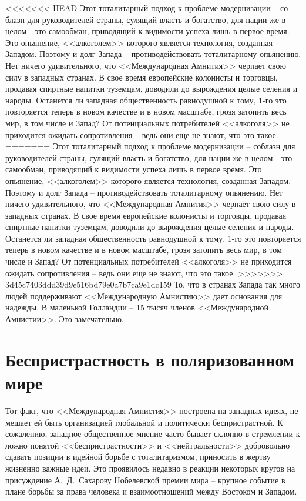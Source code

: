 \documentclass{book}
\begin{document}
{<<<<<<< HEAD
Этот тоталитарный подход к проблеме модернизации -- со­блазн для руководителей страны, сулящий власть и богатство, для нации же в целом ‑ это самообман, приводящий к види­мости успеха лишь в первое время. Это опьянение, <<алкого­лем>> которого является технология, созданная Западом. Поэто­му и долг Запада -- противодействовать тоталитарному опья­нению. Нет ничего удивительного, что <<Международная Амнития>> черпает свою силу в западных странах. В свое время евро­пейские колонисты и торговцы, продавая спиртные напитки туземцам, доводили до вырождения целые селения и народы. Останется ли западная общественность равнодушной к тому, 1-го это повторяется теперь в новом качестве и в новом мас­штабе, грозя затопить весь мир, в том числе и Запад? От потен­циальных потребителей <<алкоголя>> не приходится ожидать сопротивления -- ведь они еще не знают, что это такое.
=======
Этот тоталитарный подход к проблеме модернизации -- со­блазн для руководителей страны, сулящий власть и богатство, для нации же в целом - это самообман, приводящий к види­мости успеха лишь в первое время. Это опьянение, <<алкого­лем>> которого является технология, созданная Западом. Поэто­му и долг Запада -- противодействовать тоталитарному опья­нению. Нет ничего удивительного, что <<Международная Амнития>> черпает свою силу в западных странах. В свое время евро­пейские колонисты и торговцы, продавая спиртные напитки туземцам, доводили до вырождения целые селения и народы. Останется ли западная общественность равнодушной к тому, 1-го это повторяется теперь в новом качестве и в новом мас­штабе, грозя затопить весь мир, в том числе и Запад? От потен­циальных потребителей <<алкоголя>> не приходится ожидать сопротивления -- ведь они еще не знают, что это такое.
>>>>>>> 3d45c7403ddd39d9e516bd79e0a7b7ca9e1dc159
То, что в странах Запада так много людей поддерживают <<Международную Амнистию>> дает основания для надежды. В маленькой Голландии -- 15 тысяч членов <<Международной Амнистии>>. Это замечательно.


\section{Беспристрастность в поляризованном мире}

Тот факт, что <<Международная Амнистия>> построена на за­падных идеях, не мешает ей быть организацией глобальной и политически беспристрастной. К сожалению, западное обще­ственное мнение часто бывает склонно в стремлении к ложно понятой <<беспристрастности>> и <<нейтральности>> добровольно сдавать позиции в идейной борьбе с тоталитаризмом, прино­сить в жертву жизненно важные идеи. Это проявилось недавно в реакции некоторых кругов на присуждение А.~Д.~Сахарову Нобелевской премии мира -- крупное событие в плане борьбы за права человека и взаимоотношений между Востоком и За­падом.

}
\end{document}
